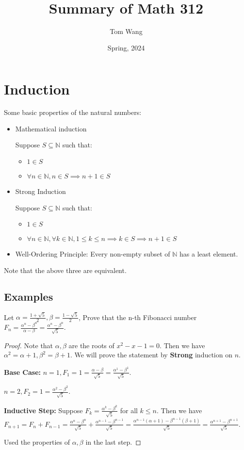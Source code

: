 \documentclass[letterpaper,12pt,oneside]{article}
\title{Summary of Math 312}
\author{Tom Wang}
\date{Spring, 2024}
\begin{document}
\maketitle
\thispagestyle{plain}
\section{Induction}
Some basic properties of the natural numbers:
\begin{itemize}
    \item Mathematical induction

          Suppose $S \subseteq \mathbb{N}$ such that:\begin{itemize}
              \item $1 \in S$
              \item $\forall n \in \mathbb{N}, n \in S \implies n+1 \in S$
          \end{itemize}
    \item Strong Induction

          Suppose $S \subseteq \mathbb{N}$ such that:\begin{itemize}
              \item $1 \in S$
              \item $\forall n \in \mathbb{N}, \forall k \in \mathbb{N}, 1 \leq k \leq n \implies k \in S \implies n+1 \in S$
          \end{itemize}
    \item Well-Ordering Principle: Every non-empty subset of $\mathbb{N}$ has a least
          element.
\end{itemize}

Note that the above three are equivalent.

\subsection{Examples}
Let $\alpha = \frac{1+\sqrt{5}}{2}, \beta = \frac{1-\sqrt{5}}{2}$, Prove that
the n-th Fibonacci number $F_n = \frac{\alpha^n - \beta^n}{\alpha - \beta} =
    \frac{\alpha^n - \beta^n}{\sqrt{5}}$.
\begin{proof}
    Note that $\alpha, \beta$ are the roots of $x^2 - x - 1 = 0$. Then we have $\alpha^2 = \alpha + 1, \beta^2 = \beta + 1$. We will prove the statement by \textbf{Strong} induction on $n$.

    \textbf{Base Case:} $n = 1, F_1 = 1 = \frac{\alpha - \beta}{\sqrt{5}} = \frac{\alpha^1 - \beta^1}{\sqrt{5}}$.

    $n=2, F_2 = 1 = \frac{\alpha^2 - \beta^2}{\sqrt{5}}$.

    \textbf{Inductive Step:} Suppose $F_k = \frac{\alpha^k - \beta^k}{\sqrt{5}}$ for all $k \leq n$. Then we have $F_{n+1} = F_n + F_{n-1} = \frac{\alpha^n - \beta^n}{\sqrt{5}} + \frac{\alpha^{n-1} - \beta^{n-1}}{\sqrt{5}} = \frac{\alpha^{n-1}(\alpha + 1) - \beta^{n-1}(\beta + 1)}{\sqrt{5}} = \frac{\alpha^{n+1} - \beta^{n+1}}{\sqrt{5}}$.

    Used the properties of $\alpha, \beta$ in the last step.
\end{proof}
\end{document}
